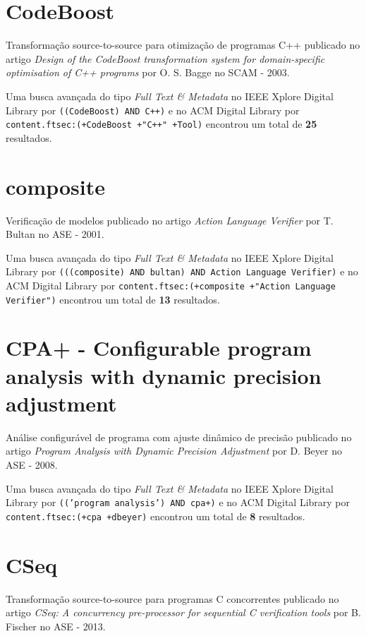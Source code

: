 \section{CodeBoost}

Transformação source-to-source para otimização de programas C++
publicado no artigo
{\it Design of the CodeBoost transformation system for domain-specific optimisation of C++ programs}
por
O. S. Bagge
no
SCAM
-
2003.


Uma busca avançada do tipo {\it Full Text \& Metadata} no IEEE Xplore Digital Library por
\texttt{((CodeBoost) AND C++)}
e no ACM Digital Library por
\texttt{content.ftsec:(+CodeBoost +"C++" +Tool)}
encontrou um total de
{\bf 25}
resultados.

\section{composite}

Verificação de modelos
publicado no artigo
{\it Action Language Verifier}
por
T. Bultan
no
ASE
-
2001.


Uma busca avançada do tipo {\it Full Text \& Metadata} no IEEE Xplore Digital Library por
\texttt{(((composite) AND bultan) AND Action Language Verifier)}
e no ACM Digital Library por
\texttt{content.ftsec:(+composite +"Action Language Verifier")}
encontrou um total de
{\bf 13}
resultados.

\section{CPA+ - Configurable program analysis with dynamic precision adjustment}

Análise configurável de programa com ajuste dinâmico de precisão
publicado no artigo
{\it Program Analysis with Dynamic Precision Adjustment}
por
D. Beyer
no
ASE
-
2008.


Uma busca avançada do tipo {\it Full Text \& Metadata} no IEEE Xplore Digital Library por
\texttt{(('program analysis') AND cpa+)}
e no ACM Digital Library por
\texttt{content.ftsec:(+cpa +dbeyer)}
encontrou um total de
{\bf 8}
resultados.

\section{CSeq}

Transformação source-to-source para programas C concorrentes
publicado no artigo
{\it CSeq: A concurrency pre-processor for sequential C verification tools}
por
B. Fischer
no
ASE
-
2013.


